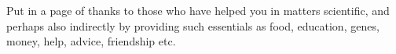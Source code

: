 








\begin{Acknowledgements}

Put in a page of thanks to those who have helped you in matters scientific, and perhaps also indirectly by providing such essentials as food, education, genes, money, help, advice, friendship etc.
\end{Acknowledgements}